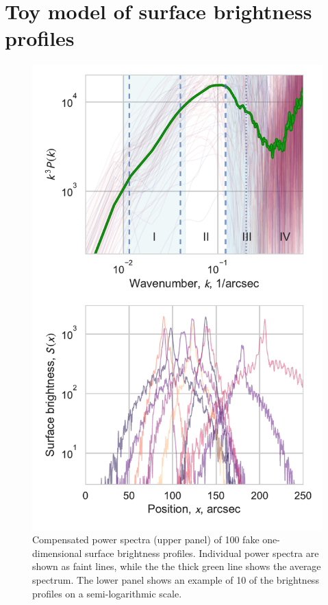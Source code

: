 \documentclass[useAMS,usenatbib]{mnras}
\begin{document}
\section{Toy model of surface brightness profiles}
\label{sec:toy-model-surface}
\begin{figure}
  \centering
  \includegraphics[width=\linewidth]{fake-powerspec}
  \caption{Compensated power spectra (upper panel) of 100 fake
    one-dimensional surface brightness profiles.  Individual power
    spectra are shown as faint lines, while the the thick green line
    shows the average spectrum.  The lower panel shows an example of
    10 of the brightness profiles on a semi-logarithmic scale.}
  \label{fig:fake-powerspec}
\end{figure}
\end{document}
